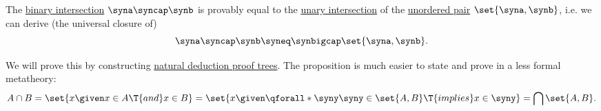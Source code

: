 \begin{proposition}\label{thm:binary_set_intersection_via_pair}
  The \hyperref[def:set_intersection/binary]{binary intersection} \( \syna \syncap \synb \) is provably equal to the \hyperref[def:set_intersection/unary]{unary intersection} of the \hyperref[def:unordered_pair]{unordered pair} \( \set{ \syna, \synb } \), i.e. we can derive (the universal closure of)
  \begin{equation*}
    \syna \syncap \synb \syneq \synbigcap \set{ \syna, \synb }.
  \end{equation*}
\end{proposition}
\begin{comments}
  \item We will prove this by constructing \hyperref[def:fol_natural_deduction_proof_tree]{natural deduction proof trees}. The proposition is much easier to state and prove in a less formal metatheory:
  \begin{equation*}
    A \cap B = \set{ x \given x \in A \T{and} x \in B } = \set{ x \given \qforall* \syny \syny \in \set{ A, B } \T{implies} x \in \syny } = \bigcap \set{ A, B }.
  \end{equation*}
\end{comments}

